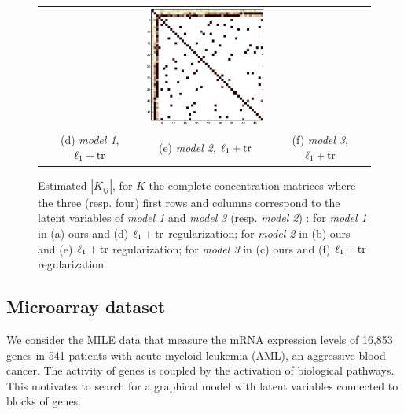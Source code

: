 \begin{figure}
\begin{tabular}{ccc}
  &   \includegraphics[width=4cm]{fig/diff_tr}
   \\    (d)  \textit{model 1}, $\ell_1+{\rm tr}$ & (e)  \textit{model 2}, $\ell_1+{\rm tr}$  & (f)  \textit{model 3}, $\ell_1+{\rm tr}$  \\[6pt]
\end{tabular}
\caption{Estimated $|K_{ij}|$, for $K$ the complete concentration matrices where the three (resp. four) first rows and columns correspond to the latent variables of \textit{model 1} and \textit{model 3} (resp. \textit{model 2}) : for \textit{model 1} in (a) ours and (d) $\ell_1+{\rm tr}$ regularization; for \textit{model 2} in (b) ours and (e) $\ell_1+{\rm tr}$ regularization; for \textit{model 3} in (c) ours and (f) $\ell_1+{\rm tr}$ regularization }
\end{figure}


\subsection{Microarray dataset}

We consider the MILE data \citep{haferlach2010clinical} that measure the mRNA expression levels of 16,853 genes in 541 patients with acute myeloid leukemia (AML), an aggressive blood cancer. The activity of genes is coupled by the activation of biological pathways. This motivates to search for a graphical model with latent variables connected to blocks of genes.

